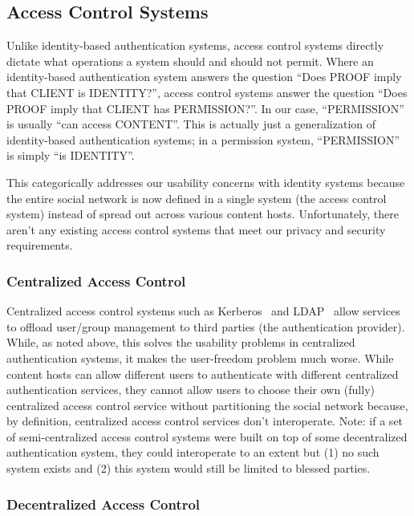 \documentclass[pdftex,12pt,a4papaer,twoside,notitlepage]{report}
\begin{document}
\subsection{Access Control Systems}

Unlike identity-based authentication systems, access control systems directly
dictate what operations a system should and should not permit. Where an
identity-based authentication system answers the question ``Does PROOF imply
that CLIENT is IDENTITY?'', access control systems answer the question ``Does
PROOF imply that CLIENT has PERMISSION?''. In our case, ``PERMISSION'' is
usually ``can access CONTENT''. This is actually just a generalization of
identity-based authentication systems; in a permission system, ``PERMISSION'' is
simply ``is IDENTITY''.

This categorically addresses our usability concerns with identity systems
because the entire social network is now defined in a single system (the access
control system) instead of spread out across various content hosts.
Unfortunately, there aren't any existing access control systems that meet our
privacy and security requirements.

\subsubsection{Centralized Access Control}

Centralized access control systems such as Kerberos~\cite{kerberos} and
LDAP~\cite{ldap} allow services to offload user/group management to third
parties (the authentication provider). While, as noted above, this solves the
usability problems in centralized authentication systems, it makes the
user-freedom problem much worse. While content hosts can allow different users
to authenticate with different centralized authentication services, they cannot
allow users to choose their own (fully) centralized access control service
without partitioning the social network because, by definition, centralized
access control services don't interoperate. Note: if a set of semi-centralized
access control systems were built on top of some decentralized authentication
system, they could interoperate to an extent but (1) no such system exists and
(2) this system would still be limited to blessed parties.

\subsubsection{Decentralized Access Control}
\end{document}
